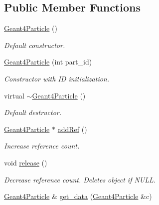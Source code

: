 \subsection*{Public Member Functions}
\begin{DoxyCompactItemize}
\item 
\hyperlink{class_d_d4hep_1_1_simulation_1_1_geant4_particle_a7fbf091b0805aeada441aa5850a8c660}{Geant4Particle} ()
\begin{DoxyCompactList}\small\item\em Default constructor. \item\end{DoxyCompactList}\item 
\hyperlink{class_d_d4hep_1_1_simulation_1_1_geant4_particle_a3fedeb9cf8f88104e7457305164145d8}{Geant4Particle} (int part\_\-id)
\begin{DoxyCompactList}\small\item\em Constructor with ID initialization. \item\end{DoxyCompactList}\item 
virtual \hyperlink{class_d_d4hep_1_1_simulation_1_1_geant4_particle_a6826af4b7518aeb0e2396eb7abaed67c}{$\sim$Geant4Particle} ()
\begin{DoxyCompactList}\small\item\em Default destructor. \item\end{DoxyCompactList}\item 
\hyperlink{class_d_d4hep_1_1_simulation_1_1_geant4_particle}{Geant4Particle} $\ast$ \hyperlink{class_d_d4hep_1_1_simulation_1_1_geant4_particle_a57fda35759c8768450ef1c7d5509c281}{addRef} ()
\begin{DoxyCompactList}\small\item\em Increase reference count. \item\end{DoxyCompactList}\item 
void \hyperlink{class_d_d4hep_1_1_simulation_1_1_geant4_particle_a41e9f1e5d735616691cfbf1073e08bd2}{release} ()
\begin{DoxyCompactList}\small\item\em Decrease reference count. Deletes object if NULL. \item\end{DoxyCompactList}\item 
\hyperlink{class_d_d4hep_1_1_simulation_1_1_geant4_particle}{Geant4Particle} \& \hyperlink{class_d_d4hep_1_1_simulation_1_1_geant4_particle_ac1991c4a882d0c4515baebb329215516}{get\_\-data} (\hyperlink{class_d_d4hep_1_1_simulation_1_1_geant4_particle}{Geant4Particle} \&c)

\end{DoxyCompactItemize}
